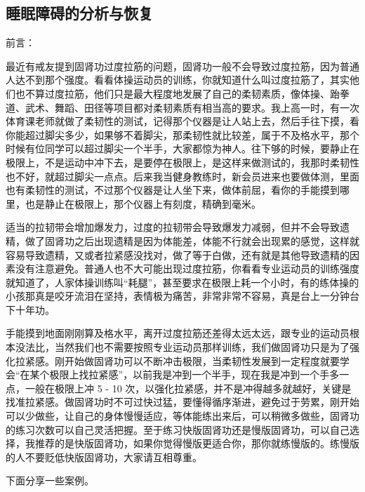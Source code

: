 \subsection{睡眠障碍的分析与恢复}

前言：

最近有戒友提到固肾功过度拉筋的问题，固肾功一般不会导致过度拉筋，因为普通人达不到那个强度。看看体操运动员的训练，你就知道什么叫过度拉筋了，其实他们也不算过度拉筋，他们只是最大程度地发展了自己的柔韧素质，像体操、跆拳道、武术、舞蹈、田径等项目都对柔韧素质有相当高的要求。我上高一时，有一次体育课老师就做了柔韧性的测试，记得那个仪器是让人站上去，然后手往下摸，看你能超过脚尖多少，如果够不着脚尖，那柔韧性就比较差，属于不及格水平，那个时候有位同学可以超过脚尖一个半手，大家都惊为神人。往下够的时候，要静止在极限上，不是运动中冲下去，是要停在极限上，是这样来做测试的，我那时柔韧性也不好，就超过脚尖一点点。后来我当健身教练时，新会员进来也要做体测，里面也有柔韧性的测试，不过那个仪器是让人坐下来，做体前屈，看你的手能摸到哪里，也是静止在极限上，那个仪器上有刻度，精确到毫米。

适当的拉韧带会增加爆发力，过度的拉韧带会导致爆发力减弱，但并不会导致遗精，做了固肾功之后出现遗精是因为体能差，体能不行就会出现累的感觉，这样就容易导致遗精，又或者拉紧感没找对，做了等于白做，还有就是其他导致遗精的因素没有注意避免。普通人也不大可能出现过度拉筋，你看看专业运动员的训练强度就知道了，人家体操训练叫“耗腿”，甚至要求在极限上耗一个小时，有的练体操的小孩那真是咬牙流泪在坚持，表情极为痛苦，非常非常不容易，真是台上一分钟台下十年功。

手能摸到地面刚刚算及格水平，离开过度拉筋还差得太远太远，跟专业的运动员根本没法比，当然我们也不需要按照专业运动员那样训练，我们做固肾功只是为了强化拉紧感。刚开始做固肾功可以不断冲击极限，当柔韧性发展到一定程度就要学会“在某个极限上找拉紧感”，以前我是冲到一个半手，现在我是冲到一个手多一点，一般在极限上冲 5 - 10 次，以强化拉紧感，并不是冲得越多就越好，关键是找准拉紧感。做固肾功时不可过快过猛，要懂得循序渐进，避免过于劳累，刚开始可以少做些，让自己的身体慢慢适应，等体能练出来后，可以稍微多做些，固肾功的练习次数可以自己灵活把握。至于练习快版固肾功还是慢版固肾功，可以自己选择，我推荐的是快版固肾功，如果你觉得慢版更适合你，那你就练慢版的。练慢版的人不要贬低快版固肾功，大家请互相尊重。

下面分享一些案例。

